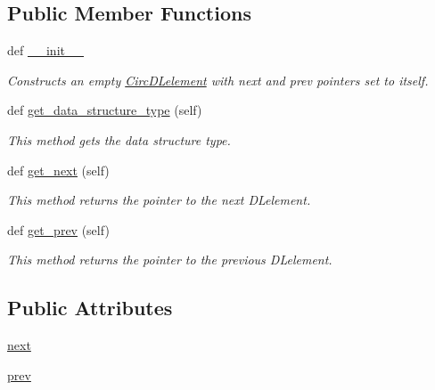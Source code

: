 \subsection*{Public Member Functions}
\begin{DoxyCompactItemize}
\item 
def \hyperlink{classbridges_1_1circ__dl__element_1_1_circ_d_lelement_a58a07a5b75177d5f00fe5824f7f1413e}{\+\_\+\+\_\+init\+\_\+\+\_\+}
\begin{DoxyCompactList}\small\item\em Constructs an empty \hyperlink{classbridges_1_1circ__dl__element_1_1_circ_d_lelement}{Circ\+D\+Lelement} with next and prev pointers set to itself. \end{DoxyCompactList}\item 
def \hyperlink{classbridges_1_1circ__dl__element_1_1_circ_d_lelement_ac33a5699a662730bb6f292654e6896dc}{get\+\_\+data\+\_\+structure\+\_\+type} (self)
\begin{DoxyCompactList}\small\item\em This method gets the data structure type. \end{DoxyCompactList}\item 
def \hyperlink{classbridges_1_1circ__dl__element_1_1_circ_d_lelement_a7a0432dd9694cb389db12a0027af04cc}{get\+\_\+next} (self)
\begin{DoxyCompactList}\small\item\em This method returns the pointer to the next D\+Lelement. \end{DoxyCompactList}\item 
def \hyperlink{classbridges_1_1circ__dl__element_1_1_circ_d_lelement_ab22f5daaddd55928455e0d85e88a6c03}{get\+\_\+prev} (self)
\begin{DoxyCompactList}\small\item\em This method returns the pointer to the previous D\+Lelement. \end{DoxyCompactList}\end{DoxyCompactItemize}
\subsection*{Public Attributes}
\begin{DoxyCompactItemize}
\item 
\hyperlink{classbridges_1_1circ__dl__element_1_1_circ_d_lelement_a0f01f7ff433628bac241d7c069a476fa}{next}
\item 
\hyperlink{classbridges_1_1circ__dl__element_1_1_circ_d_lelement_a78ed845303a07e303bcbb39f015843d0}{prev}
\end{DoxyCompactItemize}
